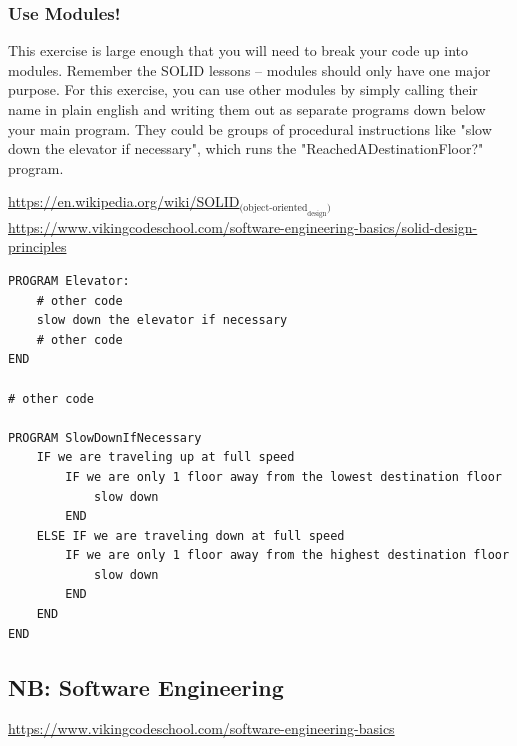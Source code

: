 \documentclass[11pt]{article}
\begin{document}
\subsubsection{Use Modules!}
\label{sec-2-1-3}

This exercise is large enough that you will need to break your code up into
modules. Remember the SOLID lessons -- modules should only have one major 
purpose. For this exercise, you can use other modules by simply calling 
their name in plain english and writing them out as separate programs down
below your main program. They could be groups of procedural instructions 
like "slow down the elevator if necessary", which runs the 
"ReachedADestinationFloor?" program.

\url{https://en.wikipedia.org/wiki/SOLID}$_{\text{(object-oriented}_{\text{design}}\text{)}}$
\url{https://www.vikingcodeschool.com/software-engineering-basics/solid-design-principles}

\begin{verbatim}
PROGRAM Elevator:
    # other code
    slow down the elevator if necessary
    # other code
END

# other code

PROGRAM SlowDownIfNecessary
    IF we are traveling up at full speed
        IF we are only 1 floor away from the lowest destination floor
            slow down
        END
    ELSE IF we are traveling down at full speed
        IF we are only 1 floor away from the highest destination floor
            slow down
        END
    END
END
\end{verbatim}

\subsection{NB: Software Engineering}
\label{sec-2-2}

\url{https://www.vikingcodeschool.com/software-engineering-basics}
\end{document}
